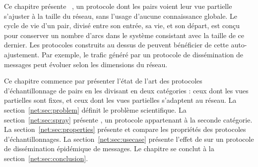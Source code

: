


Ce chapitre présente \SPRAY~\cite{nedelec2015spray}, un protocole dont les pairs
voient leur vue partielle s'ajuster à la taille du réseau, sans l'usage d'aucune
connaissance globale. Le cycle de vie d'un pair, divisé entre son entrée, sa
vie, et son départ, est conçu pour conserver un nombre d'arcs dans le système
consistant avec la taille de ce dernier. Les protocoles construits au dessus de
\SPRAY peuvent bénéficier de cette auto-ajustement. Par exemple, le trafic
généré par un protocole de dissémination de messages peut évoluer selon les
dimensions du réseau.

Ce chapitre commence par présenter l'état de l'art des protocoles
d'échantillonnage de pairs en les divisant en deux catégories : ceux dont les
vues partielles sont fixes, et ceux dont les vues partielles s'adaptent au
réseau. La section~\ref{net:sec:problem} définit le problème scientifique.
La section~\ref{net:sec:spray} présente
\SPRAY, un protocole appartenant à la seconde catégorie. La
section~\ref{net:sec:properties} présente et compare les propriétés des
protocoles d'échantillonnages. La section~\ref{net:sec:usecase} présente l'effet
de \SPRAY sur un protocole de dissémination épidémique de messages. Le chapitre
se conclut à la section~\ref{net:sec:conclusion}.

